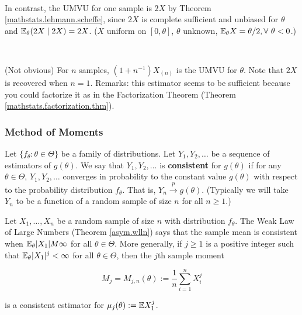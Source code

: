 \begin{example}
\

In contrast, the UMVU for one sample is \(2X\) by Theorem \ref{mathstats.lehmann.scheffe}, since \(2X\) is complete sufficient and unbiased for \(\theta\) and \(\E_\theta(2X \mid 2X) = 2X\). (\(X\) uniform on \([0, \theta]\), \(\theta\) unknown, \(\E_\theta X = \theta/2, \forall \ \theta < 0\).) 

\

(Not obvious) For \(n\) samples, \((1 + n^{-1}) X_{(n)}\) is the UMVU for \(\theta\). Note that \(2X\) is recovered when \(n=1\). Remarks: this estimator seems to be sufficient because you could factorize it as in the Factorization Theorem (Theorem \ref{mathstats.factorization.thm}). 

\end{example}

\subsubsection{Method of Moments}

\begin{definition} Let \(\{f_\theta: \theta \in \Theta\}\) be a family of distributions. Let \(Y_1, Y_2, \ldots\) be a sequence of estimators of \(g(\theta)\). We say that \(Y_1, Y_2, \ldots\) is \textbf{consistent} for \(g(\theta)\) if for any \(\theta \in \Theta\), \(Y_1, Y_2, \ldots\) converges in probability to the constant value \(g(\theta)\) with respect to the probability distribution \(f_\theta\). That is, \(Y_n \xrightarrow{p} g(\theta)\). (Typically we will take \(Y_n\) to be a function of a random sample of size \(n\) for all \(n \geq 1\).) 

\end{definition}

\begin{example} Let \(X_1, \ldots, X_n\) be a random sample of size \(n\) with distribution \(f_\theta\). The Weak Law of Large Numbers (Theorem \ref{asym.wlln}) says that the sample mean is consistent when \(\E_\theta |X_1| M \infty\) for all \(\theta \in \Theta\). More generally, if \(j \geq 1\) is a positive integer such that \(\E_\theta |X_1|^j < \infty\) for all \(\theta \in \Theta\), then the \(j\)th sample moment

\[
M_j = M_{j,n}(\theta) := \frac{1}{n} \sum_{i=1}^n X_i^j
\]

is a consistent estimator for \(\mu_j(\theta) := \E X_1^j\).

\end{example}

